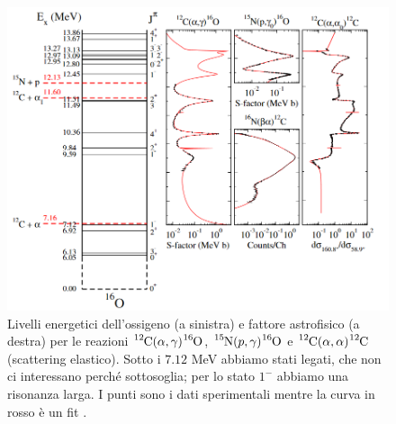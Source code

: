 \begin{figure}[h]
	\centering
	\includegraphics[scale=0.6]{Immagini/0426_lv.png}
	\caption{Livelli energetici dell'ossigeno (a sinistra) e fattore astrofisico (a destra) per le reazioni $\ce{^{12}C}(\alpha,\gamma)\ce{^{16}O}$, $\ce{^{15}N}(p,\gamma)\ce{^{16}O}$ e $\ce{^{12}C}(\alpha,\alpha)\ce{^{12}C}$ (scattering elastico). Sotto i $7.12$ MeV abbiamo stati legati, che non ci interessano perché sottosoglia; per lo stato $1^-$ abbiamo una risonanza larga. I punti sono i dati sperimentali mentre la curva in rosso è un fit .}
	\label{0426_lv}
\end{figure}

